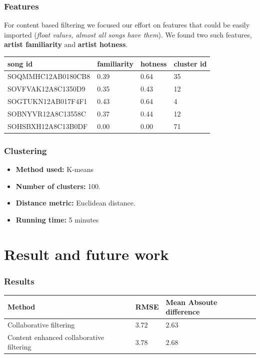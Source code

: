 \documentclass[11pt]{beamer}
\begin{document}
  \begin{frame}
    \frametitle{Features}
    For content based filtering we focused our effort on features that could be easily imported ({\it float values, almost all songs have them}). We found two such features,
    {\bf artist familiarity} and {\bf artist hotness}.
    \begin{table}
      \begin{tabular}{|p{4.5cm}|p{2cm} p{2cm} p{2cm}|}
        \hline
        {\bf song id} & {\bf familiarity} & {\bf hotness} & {\bf cluster id}\\
        \hline
        \hline
          SOQMMHC12AB0180CB8&           0.39&            0.64&       35\\
          SOVFVAK12A8C1350D9&           0.35&            0.43&       12\\
          SOGTUKN12AB017F4F1&           0.43&            0.64&        4\\
          SOBNYVR12A8C13558C&           0.37&            0.44&       12\\
          SOHSBXH12A8C13B0DF&           0.00&            0.00&       71\\
        \hline
      \end{tabular}
    \end{table}
  \end{frame}

  \begin{frame}
    \frametitle{Clustering}
    \begin{itemize}
      \item {\bf Method used:} K-means
      \item {\bf Number of clusters:} 100.
      \item {\bf Distance metric:} Euclidean distance.
      \item {\bf Running time:} 5 minutes
    \end{itemize}
  \end{frame}


  \section{Result and future work}
  \begin{frame}
    \frametitle{Results}
    \begin{table}
      \begin{tabular}{|p{5cm}|p{3cm} p{3cm}|}
        \hline
        {\bf Method} & {\bf RMSE} & {\bf Mean Absoute difference} \\
        \hline
        \hline
        {\color{red} Collaborative filtering} & {\color{red}$3.72$} & {\color{red}$2.63$}\\
        {\color{blue}Content enhanced collaborative filtering} & {\color{blue}$3.78$} & {\color{blue}$2.68$}\\
        \hline
      \end{tabular}
    \end{table}
  \end{frame}
\end{document}
